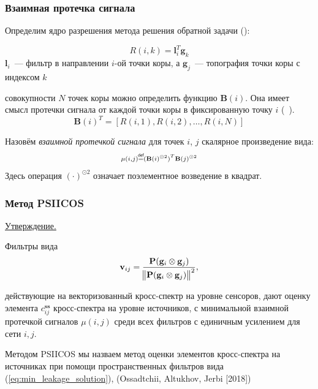 \documentclass[12pt]{beamer}
\renewcommand{\vec}[1]{\mathbf{#1}}
\newcommand\defeq{\mathrel{\overset{\makebox[0pt]{\mbox{\normalfont\tiny\sffamily def}}}{=}}}
\newcommand{\matr}[1]{\mathbf{#1}}
\begin{document}
\begin{frame}[t]
    \frametitle{Взаимная протечка сигнала}
{\tiny Определим ядро разрешения метода решения обратной задачи (\cite{Sekihara2007}):}
    
\begin{equation}
    \scriptstyle
    R(i, k) = \vec{l}_i^T \vec{g}_k
    \label{eq:resolution_kernel}
\end{equation}
{\tiny $\vec{l}_i$~--- фильтр в направлении $i$-ой точки коры, а
$\vec{g}_j$~--- топография точки коры с индексом $k$}

{ совокупности $N$ точек коры можно определить функцию
$\vec{B}(i)$. Она имеет смысл протечки сигнала от каждой точки коры в
фиксированную точку $i$ (~\cite{Sekihara2007}).}
\begin{equation}
    \scriptstyle
    \vec{B}{(i)}^T = \left[R{(i, 1)}, R(i, 2), \ldots, R(i, N)\right]
\end{equation}

{\tiny Назовём \emph{взаимной протечкой сигнала} для точек $i$, $j$ скалярное произведение вида:}
\begin{equation}
    \scriptstyle
    \mu(i, j) \defeq {(\vec{B}{(i)}^{\odot 2})}^T \vec{B}{(j)}^{\odot 2}
    \label{eq:def_mutual_leakage}
\end{equation}
{\tiny Здесь операция ${(\cdot)}^{\odot 2}$ означает поэлементное возведение в квадрат.}
\end{frame}


\begin{frame}[t]
    \frametitle{Метод PSIICOS}

    \vspace{1cm}

    \underline{Утверждение.}
    \vspace{3mm}

    {\footnotesize Фильтры вида}
    \begin{equation}
        \vec{v}_{ij} = \frac{\matr{P} ( \mathbf{g}_i\otimes \mathbf{g}_j) } { \norm{\matr{P}( \mathbf{g}_i\otimes \mathbf{g}_j)}^2 },
        \label{eq:min_leakage_solution}
    \end{equation}
    {\footnotesize действующие на векторизованный кросс-спектр на уровне сенсоров, дают оценку
        элемента $c_{ij}^{\mathbf{ss}}$ кросс-спектра на уровне источников, с минимальной взаимной протечкой сигналов
    $\mu(i, j)$ среди всех фильтров с единичным усилением для сети $i, j$.

    \vspace{3mm}
    Методом PSIICOS мы назваем метод оценки элементов кросс-спектра на источниках
при помощи пространственных фильтров вида (\ref{eq:min_leakage_solution}), (Ossadtchii, Altukhov, Jerbi [2018])}
    
\end{frame}
\end{document}
